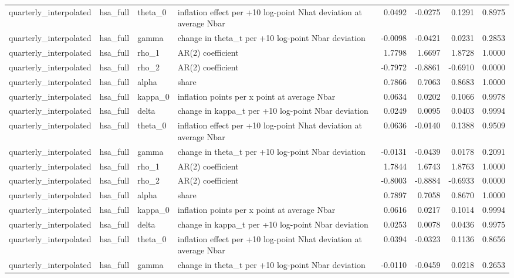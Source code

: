 \begin{tabular}{llllrrrr}
quarterly\_interpolated & hsa\_full & theta\_0 & inflation effect per +10 log-point Nhat deviation at average Nbar & 0.0492 & -0.0275 & 0.1291 & 0.8975 \\
quarterly\_interpolated & hsa\_full & gamma & change in theta\_t per +10 log-point Nbar deviation & -0.0098 & -0.0421 & 0.0231 & 0.2853 \\
quarterly\_interpolated & hsa\_full & rho\_1 & AR(2) coefficient & 1.7798 & 1.6697 & 1.8728 & 1.0000 \\
quarterly\_interpolated & hsa\_full & rho\_2 & AR(2) coefficient & -0.7972 & -0.8861 & -0.6910 & 0.0000 \\
quarterly\_interpolated & hsa\_full & alpha & share & 0.7866 & 0.7063 & 0.8683 & 1.0000 \\
quarterly\_interpolated & hsa\_full & kappa\_0 & inflation points per x point at average Nbar & 0.0634 & 0.0202 & 0.1066 & 0.9978 \\
quarterly\_interpolated & hsa\_full & delta & change in kappa\_t per +10 log-point Nbar deviation & 0.0249 & 0.0095 & 0.0403 & 0.9994 \\
quarterly\_interpolated & hsa\_full & theta\_0 & inflation effect per +10 log-point Nhat deviation at average Nbar & 0.0636 & -0.0140 & 0.1388 & 0.9509 \\
quarterly\_interpolated & hsa\_full & gamma & change in theta\_t per +10 log-point Nbar deviation & -0.0131 & -0.0439 & 0.0178 & 0.2091 \\
quarterly\_interpolated & hsa\_full & rho\_1 & AR(2) coefficient & 1.7844 & 1.6743 & 1.8763 & 1.0000 \\
quarterly\_interpolated & hsa\_full & rho\_2 & AR(2) coefficient & -0.8003 & -0.8884 & -0.6933 & 0.0000 \\
quarterly\_interpolated & hsa\_full & alpha & share & 0.7897 & 0.7058 & 0.8670 & 1.0000 \\
quarterly\_interpolated & hsa\_full & kappa\_0 & inflation points per x point at average Nbar & 0.0616 & 0.0217 & 0.1014 & 0.9994 \\
quarterly\_interpolated & hsa\_full & delta & change in kappa\_t per +10 log-point Nbar deviation & 0.0253 & 0.0078 & 0.0436 & 0.9975 \\
quarterly\_interpolated & hsa\_full & theta\_0 & inflation effect per +10 log-point Nhat deviation at average Nbar & 0.0394 & -0.0323 & 0.1136 & 0.8656 \\
quarterly\_interpolated & hsa\_full & gamma & change in theta\_t per +10 log-point Nbar deviation & -0.0110 & -0.0459 & 0.0218 & 0.2653 \\

\end{tabular}
